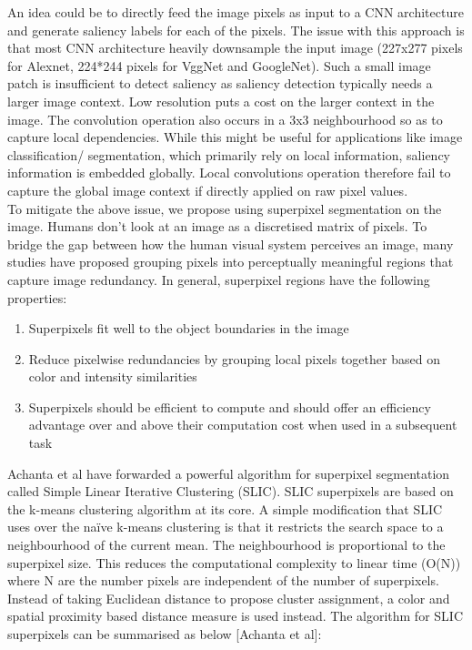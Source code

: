 \documentclass[journal]{IEEEtran}
\begin{document}
{An idea could be to directly feed the image pixels as input to a CNN architecture and generate saliency labels for each of the pixels. The issue with this approach is that most CNN architecture heavily downsample the input image (227x277 pixels for Alexnet, 224*244 pixels for VggNet and GoogleNet).  Such a small image patch is insufficient to detect saliency as saliency detection typically needs a larger image context. Low resolution puts a cost on the larger context in the image. The convolution operation also occurs in a 3x3 neighbourhood so as to capture local dependencies. While this might be useful for applications like image classification/ segmentation, which primarily rely on local information, saliency information is embedded globally. Local convolutions operation therefore fail to capture the global image context if directly applied on raw pixel values.\\

To mitigate the above issue, we propose using superpixel segmentation on the image. Humans don’t look at an image as a discretised matrix of pixels. To bridge the gap between how the human visual system perceives an image, many studies have proposed grouping pixels into perceptually meaningful regions that capture image redundancy. In general, superpixel regions have the following properties: \\
\begin{enumerate}
	\item Superpixels fit well to the object boundaries in the image
	\item Reduce pixelwise redundancies by grouping local pixels together based on color and intensity similarities
	\item Superpixels should be efficient to compute and should offer an efficiency advantage over and above their computation cost when used in a subsequent task
\end{enumerate}

Achanta et al have forwarded a powerful algorithm for superpixel segmentation called Simple Linear Iterative Clustering (SLIC). SLIC superpixels are based on the k-means clustering algorithm at its core. A simple modification that SLIC uses over the naïve k-means clustering is that it restricts the search space to a neighbourhood of the current mean. The neighbourhood is proportional to the superpixel size. This reduces the computational complexity to linear time (O(N)) where N are the number pixels are independent of the number of superpixels. Instead of taking Euclidean distance to propose cluster assignment, a color and spatial proximity based distance measure is used instead. The algorithm for SLIC superpixels can be summarised as below [Achanta et al]:\\

}
\end{document}
